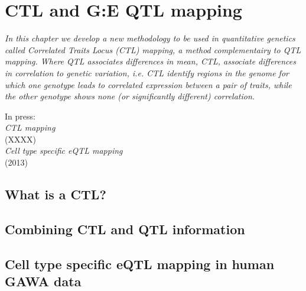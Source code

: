 \chapter{CTL and G:E QTL mapping}
\label{chap:ctlmapping}

\emph{In this chapter we develop a new methodology to be used in quantitative genetics 
called Correlated Traits Locus (CTL) mapping, a method complementairy to QTL mapping. 
Where QTL associates differences in mean, CTL, associate differences in correlation to 
genetic variation, i.e. CTL identify regions in the genome for which one genotype leads 
to correlated expression between a pair of traits, while the other genotype shows none 
(or significantly different) correlation.}

\null
\vfill

\begin{myexampleblock}{In press:}
  \\
  \emph{CTL mapping}\\
   (XXXX)
  \\
  \emph{Cell type specific eQTL mapping}\\
   (2013)
\end{myexampleblock}

\newpage

\section{What is a CTL?}
\lipsum[1]

\section{Combining CTL and QTL information}
\lipsum

\section{Cell type specific eQTL mapping in human GAWA data}
\label{sec:cellspecificeqtl}


